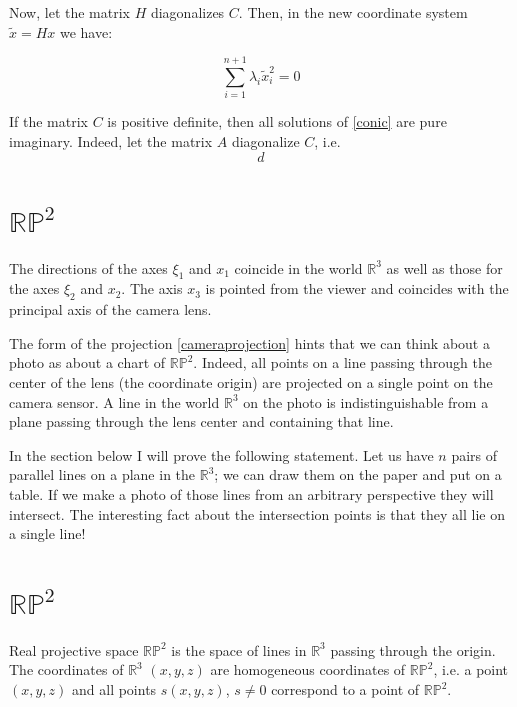 \documentclass[a4paper,10pt]{article}
\begin{document}
Now, let the matrix $H$ diagonalizes $C$. Then, in the new coordinate system $\tilde{x} = H x$ we have:

\begin{equation}
 \sum\limits_{i=1}^{n+1} \lambda_i \tilde{x}_i^2 = 0
\end{equation}



If the matrix $C$ is positive definite, then all solutions of \eqref{conic} are pure imaginary. Indeed, let the matrix $A$ diagonalize $C$, i.e.
\begin{equation}
d
\end{equation}
 

 





\section{$\mathbb{RP}^2$}


The directions of the axes $\xi_1$ and $x_1$ coincide in the world $\mathbb{R}^3$ as well as those for the axes  $\xi_2$ and $x_2$. The axis $x_3$ is pointed from the viewer and coincides with the principal axis of the camera lens. 

The form of the projection \eqref{cameraprojection} hints that we can think about a photo as about a chart of $\mathbb{RP}^2$. Indeed, all points on a line passing through the center of the lens (the coordinate origin) are projected on a single point on the camera sensor. A line in the world $\mathbb{R}^3$ on the photo is indistinguishable from a plane passing through the lens center and containing that line.  

In the section below I will prove the following statement. Let us have $n$ pairs of parallel lines on a plane in the $\mathbb{R}^3$; we can draw them on the paper and put on a table. If we make a photo of those lines from an arbitrary perspective they will intersect. The interesting fact about  the intersection points is that they all lie on a single line!

\section{$\mathbb{RP}^2$ }
 Real projective space $\mathbb{RP}^2$ is the space of lines in $\mathbb{R}^{3}$ passing through the origin. The coordinates of $\mathbb{R}^3$ $(x,y,z)$ are homogeneous coordinates of $\mathbb{RP}^2$, i.e. a point $(x,y,z)$ and all points $s(x,y,z)$, $s\neq 0$ correspond to a point of $\mathbb{RP}^2$.  
\end{document}
